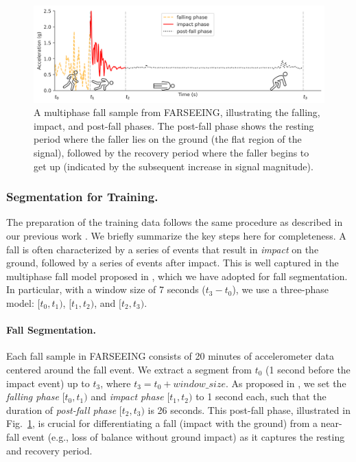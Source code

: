 \documentclass[runningheads]{llncs}
\begin{document}
\begin{figure}[t]
\includegraphics[width=\textwidth]{img/multiphase.pdf}
\caption{A multiphase fall sample from FARSEEING, illustrating the falling, impact, and post-fall phases. The post-fall phase shows the resting period where the faller lies on the ground (the flat region of the signal), followed by the recovery period where the faller begins to get up (indicated by the subsequent increase in signal magnitude).} \label{fig:multiphase}
\end{figure}

\subsubsection{Segmentation for Training.}
The preparation of the training data follows the same procedure as described in our previous work \cite{aderinola2024accurate}. We briefly summarize the key steps here for completeness. A fall is often characterized by a series of events that result in \textit{impact} on the ground, followed by a series of events after impact.  This is well captured in the multiphase fall model proposed in \cite{becker2012proposal}, which we have adopted for fall segmentation. In particular, with a window size of 7 seconds ($t_3 - t_0$), we use a three-phase model: $[t_0, t_1)$, $[t_1, t_2)$, and $[t_2, t_3)$.

\paragraph{Fall Segmentation.} Each fall sample in FARSEEING consists of 20 minutes of accelerometer data centered around the fall event. We extract a segment from $t_0$ (1 second before the impact event) up to $t_3$, where $t_3 = t_0 + window\_size$. As proposed in \cite{palmerini2020accelerometer}, we set the \textit{falling phase} $[t_0, t_1)$ and \textit{impact phase} $[t_1, t_2)$ to 1 second each, such that the duration of \textit{post-fall phase} $[t_2, t_3)$ is 26 seconds. This post-fall phase, illustrated in Fig.~\ref{fig:multiphase}, is crucial for differentiating a fall (impact with the ground) from a near-fall event (e.g., loss of balance without ground impact) as it captures the resting and recovery period.
\end{document}
